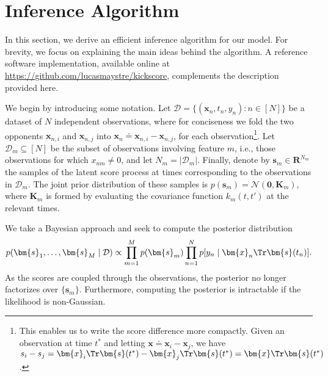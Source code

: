 \section{Inference Algorithm}
\label{sec:inference}

In this section, we derive an efficient inference algorithm for our model.
For brevity, we focus on explaining the main ideas behind the algorithm.
A reference software implementation, available online at \url{https://github.com/lucasmaystre/kickscore}, complements the description provided here.

We begin by introducing some notation.
Let $\mathcal{D} = \{ (\bm{x}_n, t_n, y_n) : n \in [N] \}$ be a dataset of $N$ independent observations, where for conciseness we fold the two opponents $\bm{x}_{n,i}$ and $\bm{x}_{n,j}$ into $\bm{x}_n \doteq \bm{x}_{n,i} - \bm{x}_{n,j}$, for each observation\footnote{%
This enables us to write the score difference more compactly.
Given an observation at time $t^*$ and letting $\bm{x} \doteq \bm{x}_i - \bm{x}_j$, we have $s_i - s_j = \bm{x}_i\Tr \bm{s}(t^*) - \bm{x}_j\Tr \bm{s}(t^*) = \bm{x}\Tr \bm{s}(t^*)$.
}.
Let $\mathcal{D}_m \subseteq [N]$ be the subset of observations involving feature $m$, i.e., those observations for which $x_{nm} \ne 0$, and let $N_m = \lvert \mathcal{D}_m \rvert$.
Finally, denote by $\bm{s}_m \in \mathbf{R}^{N_m}$ the samples of the latent score process at times corresponding to the observations in $\mathcal{D}_m$.
The joint prior distribution of these samples is $p(\bm{s}_m) = \mathcal{N}(\bm{0}, \bm{K}_m)$, where $\bm{K}_m$ is formed by evaluating the covariance function $k_m(t, t')$ at the relevant times.

We take a Bayesian approach and seek to compute the posterior distribution
\begin{align}
\label{eq:truepost}
p(\bm{s}_1, \ldots, \bm{s}_M \mid \mathcal{D}) \propto \prod_{m = 1}^M p(\bm{s}_m) \prod_{n = 1}^N p[y_n \mid \bm{x}_n\Tr \bm{s}(t_n)].
\end{align}
As the scores are coupled through the observations, the posterior no longer factorizes over $\{ \bm{s}_m \}$.
Furthermore, computing the posterior is intractable if the likelihood is non-Gaussian.


